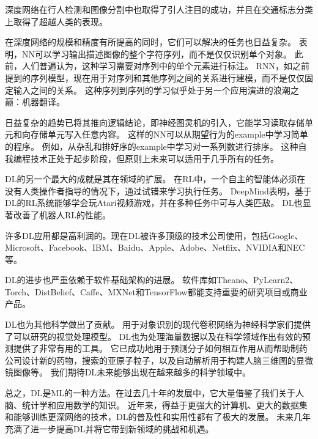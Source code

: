 深度网络在行人检测和图像分割中也取得了引人注目的成功\citep{sermanet-cvpr-13,Farabet-et-al-2013,couprie-iclr-13}，并且在交通标志分类上取得了超越人类的表现\citep{Ciresan-et-al-2012}。

在深度网络的规模和精度有所提高的同时，它们可以解决的任务也日益复杂。
\citet{Goodfellow+et+al-ICLR2014a}表明，\gls{NN}可以学习输出描述图像的整个字符序列，而不是仅仅识别单个对象。
此前，人们普遍认为，这种学习需要对序列中的单个元素进行标注\citep{Gulcehre+Bengio-arxiv-2013}。
\gls{RNN}，如之前提到的序列模型，现在用于对序列和其他序列之间的关系进行建模，而不是仅仅固定输入之间的关系。
这种序列到序列的学习似乎处于另一个应用演进的浪潮之巅：机器翻译\citep{Sutskever-et-al-NIPS2014,Bahdanau-et-al-ICLR2015-small}。


日益复杂的趋势已将其推向逻辑结论，即神经图灵机\citep{Graves-et-al-arxiv2014}的引入，它能学习读取存储单元和向存储单元写入任意内容。
这样的\gls{NN}可以从期望行为的\gls{example}中学习简单的程序。
例如，从杂乱和排好序的\gls{example}中学习对一系列数进行排序。
这种自我编程技术正处于起步阶段，但原则上未来可以适用于几乎所有的任务。


\gls{DL}的另一个最大的成就是其在领域的扩展。
在\gls{RL}中，一个自主的智能体必须在没有人类操作者指导的情况下，通过试错来学习执行任务。
DeepMind表明，基于\gls{DL}的\gls{RL}系统能够学会玩Atari视频游戏，并在多种任务中可与人类匹敌\citep{Mnih-et-al-2015}。
\gls{DL}也显著改善了机器人\gls{RL}的性能\citep{finn2015learning}。

许多\gls{DL}应用都是高利润的。现在\gls{DL}被许多顶级的技术公司使用，包括Google、Microsoft、Facebook、IBM、Baidu、Apple、Adobe、Netflix、NVIDIA和NEC等。

\gls{DL}的进步也严重依赖于软件基础架构的进展。
软件库如Theano\citep{bergstra+al:2010-scipy,Bastien-2012}、PyLearn2\citep{pylearn2_arxiv_2013}、Torch\citep{Torch-2011}、DistBelief\citep{Dean-et-al-NIPS2012}、Caffe\citep{Jia13caffe}、MXNet\citep{chen2015mxnet}和TensorFlow\citep{tensorflow}都能支持重要的研究项目或商业产品。

\gls{DL}也为其他科学做出了贡献。
用于对象识别的现代卷积网络为神经科学家们提供了可以研究的视觉处理模型\citep{dicarlo-tutorial-2013}。
\gls{DL}也为处理海量数据以及在科学领域作出有效的预测提供了非常有用的工具。
它已成功地用于预测分子如何相互作用从而帮助制药公司设计新的药物\citep{Dahl-et-al-arxiv2014}，搜索的亚原子粒子\citep{baldi2014searching}，以及自动解析用于构建人脑三维图的显微镜图像\citep{knowlesdeep}等。
我们期待\gls{DL}未来能够出现在越来越多的科学领域中。


总之，\gls{DL}是\gls{ML}的一种方法。在过去几十年的发展中，它大量借鉴了我们关于人脑、统计学和应用数学的知识。
近年来，得益于更强大的计算机、更大的数据集和能够训练更深网络的技术，\gls{DL}的普及性和实用性都有了极大的发展。
未来几年充满了进一步提高\gls{DL}并将它带到新领域的挑战和机遇。

